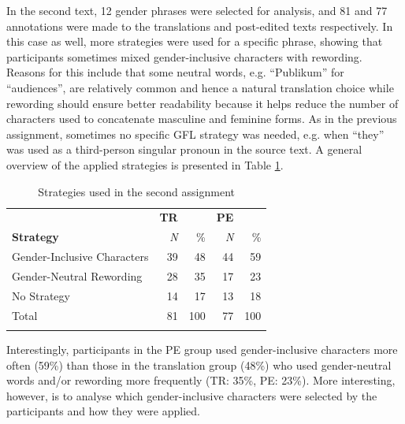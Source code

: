 In the second text, 12 gender phrases were selected for analysis, and 81 and 77 annotations were made to the translations and post-edited texts respectively. In this case as well, more strategies were used for a specific phrase, showing that participants sometimes mixed gender-inclusive characters with rewording. Reasons for this include that some neutral words, e.g. ``Publikum'' for ``audiences'', are relatively common and hence a natural translation choice while rewording should ensure better readability because it helps reduce the number of characters used to concatenate masculine and feminine forms. As in the previous assignment, sometimes no specific GFL strategy was needed, e.g. when ``they'' was used as a third-person singular pronoun in the source text. A general overview of the applied strategies is presented in Table \ref{tab:strategies2}.

\begin{table}[!ht]
    \centering
    \caption{Strategies used in the second assignment}
    \begin{tabular}{lrrrr} \lsptoprule
        & \textbf{TR} & & \textbf{PE} &  \\ 
        \textbf{Strategy} & \textit{N} & \% & \textit{N} & \% \\
\midrule
         Gender-Inclusive Characters & 39 & 48 & 44 & 59 \\ %
         Gender-Neutral Rewording & 28 & 35 & 17 & 23 \\ %
         No Strategy & 14 & 17 & 13 & 18 \\ \midrule
         Total & 81 & 100 & 77 & 100 \\
\lspbottomrule
    \end{tabular}
    \label{tab:strategies2}
\end{table}

Interestingly, participants in the PE group used gender-inclusive characters more often (59\%) than those in the translation group (48\%) who used gender-neutral words and/or rewording more frequently (TR: 35\%, PE: 23\%). More interesting, however, is to analyse which gender-inclusive characters were selected by the participants and how they were applied. 

